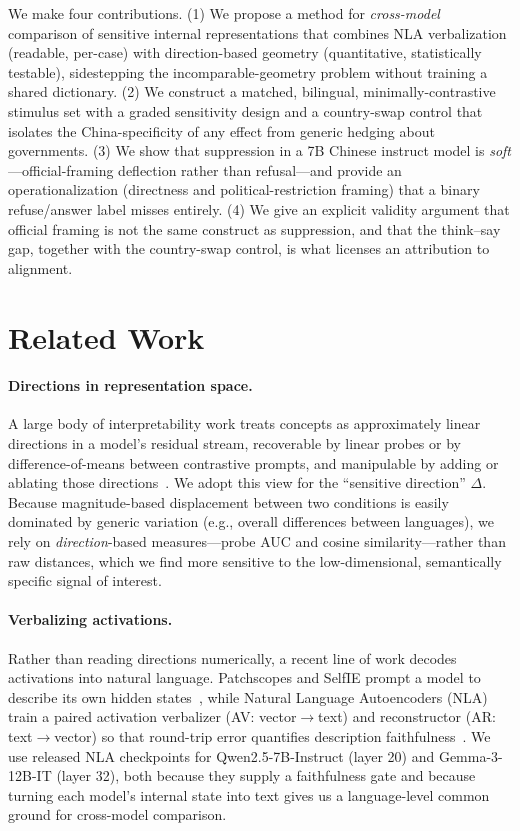 \documentclass[11pt]{article}
\begin{document}
We make four contributions. (1) We propose a method for \emph{cross-model}
comparison of sensitive internal representations that combines NLA
verbalization (readable, per-case) with direction-based geometry (quantitative,
statistically testable), sidestepping the incomparable-geometry problem
without training a shared dictionary. (2) We construct a matched, bilingual,
minimally-contrastive stimulus set with a graded sensitivity design and a
country-swap control that isolates the China-specificity of any effect from
generic hedging about governments. (3) We show that suppression in a 7B
Chinese instruct model is \emph{soft}---official-framing deflection rather than
refusal---and provide an operationalization (directness and
political-restriction framing) that a binary refuse/answer label misses
entirely. (4) We give an explicit validity argument that official framing is
not the same construct as suppression, and that the think--say gap, together
with the country-swap control, is what licenses an attribution to alignment.

\section{Related Work}

\paragraph{Directions in representation space.}
A large body of interpretability work treats concepts as approximately linear
directions in a model's residual stream, recoverable by linear probes or by
difference-of-means between contrastive prompts, and manipulable by adding or
ablating those directions~\citep{steering-caa, refusal-direction}. We adopt
this view for the ``sensitive direction'' $\Delta$. Because magnitude-based
displacement between two conditions is easily dominated by generic variation
(e.g., overall differences between languages), we rely on \emph{direction}-based
measures---probe AUC and cosine similarity---rather than raw distances, which
we find more sensitive to the low-dimensional, semantically specific signal of
interest.

\paragraph{Verbalizing activations.}
Rather than reading directions numerically, a recent line of work decodes
activations into natural language. Patchscopes and SelfIE prompt a model to
describe its own hidden states~\citep{patchscopes, selfie}, while Natural
Language Autoencoders (NLA) train a paired activation verbalizer
(AV: vector$\rightarrow$text) and reconstructor (AR: text$\rightarrow$vector)
so that round-trip error quantifies description faithfulness~\citep{nla2026}.
We use released NLA checkpoints for Qwen2.5-7B-Instruct (layer 20) and
Gemma-3-12B-IT (layer 32), both because they supply a faithfulness gate and
because turning each model's internal state into text gives us a
language-level common ground for cross-model comparison.
\end{document}
